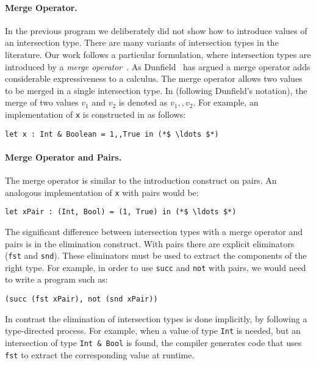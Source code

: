 \paragraph{Merge Operator.}
In the previous program we deliberately did not show how to introduce
values of an intersection type. There are many variants of
intersection types in the literature. Our work follows a particular
formulation, where intersection types are introduced by a \emph{merge
  operator}~\cite{reynolds1991coherence,Castagna92calculus,dunfield2014elaborating}. 
As Dunfield~\cite{dunfield2014elaborating} has argued a
merge operator adds considerable expressiveness to a calculus. The
merge operator allows two values to be merged in a single intersection
type. In \name (following Dunfield's notation), the merge of two
values $v_1$ and $v_2$ is denoted as $v_1 ,, v_2$.  For example, an
implementation of \lstinline{x} is constructed in \name as follows:

\begin{lstlisting}
let x : Int & Boolean = 1,,True in (*$ \ldots $*)
\end{lstlisting}

\paragraph{Merge Operator and Pairs.}
The merge operator is similar to the introduction construct on pairs.
An analogous implementation of \lstinline{x} with pairs would be:

\begin{lstlisting}
let xPair : (Int, Bool) = (1, True) in (*$ \ldots $*)
\end{lstlisting}

\noindent The significant difference between intersection types with a
merge operator and pairs is in the elimination construct. With pairs
there are explicit eliminators (\lstinline{fst} and
\lstinline{snd}). These eliminators must be used to extract the
components of the right type. For example, in order to use
\lstinline{succ} and \lstinline{not} with pairs, we would need to
write a program such as:

\begin{lstlisting}
(succ (fst xPair), not (snd xPair))
\end{lstlisting}

\noindent In contrast the elimination of intersection types is done
implicitly, by following a type-directed process. For example,
when a value of type \lstinline{Int} is needed, but an intersection
of type \lstinline{Int & Bool} is found, the compiler generates code 
that uses \lstinline{fst} to extract the corresponding value at runtime.


